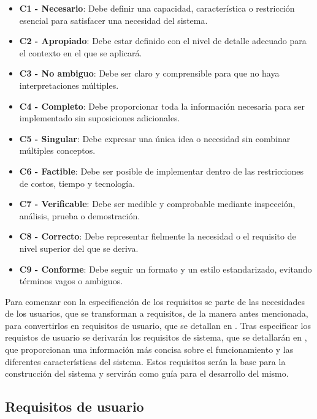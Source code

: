 \begin{itemize}

    \item \textbf{C1 - Necesario}: Debe definir una capacidad, característica o restricción esencial para satisfacer una necesidad del sistema.
    \item \textbf{C2 - Apropiado}: Debe estar definido con el nivel de detalle adecuado para el contexto en el que se aplicará.
    \item \textbf{C3 - No ambiguo}: Debe ser claro y comprensible para que no haya interpretaciones múltiples.
    \item \textbf{C4 - Completo}: Debe proporcionar toda la información necesaria para ser implementado sin suposiciones adicionales.
    \item \textbf{C5 - Singular}: Debe expresar una única idea o necesidad sin combinar múltiples conceptos.
    \item \textbf{C6 - Factible}: Debe ser posible de implementar dentro de las restricciones de costos, tiempo y tecnología.
    \item \textbf{C7 - Verificable}: Debe ser medible y comprobable mediante inspección, análisis, prueba o demostración.
    \item \textbf{C8 - Correcto}: Debe representar fielmente la necesidad o el requisito de nivel superior del que se deriva.
    \item \textbf{C9 - Conforme}: Debe seguir un formato y un estilo estandarizado, evitando términos vagos o ambiguos.

\end{itemize}

Para comenzar con la especificación de los requisitos se parte de las necesidades de los usuarios, que se transforman a requisitos, de la manera antes mencionada, para convertirlos en requisitos de usuario, que se detallan en .
Tras especificar los requistos de usuario se derivarán los requisitos de sistema, que se detallarán en , que proporcionan una información más concisa sobre el funcionamiento y las diferentes características del sistema.
Estos requisitos serán la base para la construcción del sistema y servirán como guía para el desarrollo del mismo.


\subsection{Requisitos de usuario}\label{subsec:requisitos-usuario}

